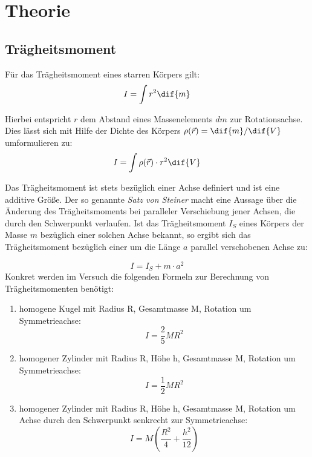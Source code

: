 \section{Theorie}

\subsection{Trägheitsmoment}
Für das Trägheitsmoment eines starren Körpers gilt:
\begin{equation}
   I = \int r^2 \dif{m}
\end{equation}

Hierbei entspricht $r$ dem Abstand eines Massenelements $dm$ zur Rotationsachse. Dies
lässt sich mit Hilfe der Dichte des Körpers $\rho(\vec{r}) = \dif{m}/\dif{V}$ umformulieren zu:
\begin{equation}
  I = \int \rho(\vec{r})\cdot r^2 \dif{V}
\end{equation}

Das Trägheitsmoment ist stets bezüglich einer Achse definiert und ist eine
additive Größe. Der so genannte \textit{Satz von Steiner} macht eine Aussage über die Änderung des Trägheitsmoments
bei paralleler Verschiebung jener Achsen, die durch den Schwerpunkt verlaufen. Ist das
Trägheitsmoment $I_S$ eines Körpers der Masse $m$ bezüglich einer solchen Achse bekannt, so ergibt sich das
Trägheitsmoment bezüglich einer um die Länge $a$ parallel verschobenen Achse zu:

\begin{equation}
    I = I_S + m \cdot a^2
    \label{eq: steiner}
\end{equation}
Konkret werden im Versuch die folgenden Formeln zur Berechnung von Trägheitsmomenten benötigt:
\begin{enumerate}
  \item homogene Kugel mit Radius R, Gesamtmasse M, Rotation um Symmetrieachse:
  \begin{equation}
    I = \frac{2}{5}M R^2
  \end{equation}

  \item homogener Zylinder mit Radius R, Höhe h, Gesamtmasse M, Rotation um Symmetrieachse:
  \begin{equation}
    I = \frac{1}{2} M R^2
  \end{equation}

  \item homogener Zylinder mit Radius R, Höhe h, Gesamtmasse M, Rotation um Achse durch den Schwerpunkt senkrecht zur Symmetrieachse:
  \begin{equation}
    I = M (\frac{R^2}{4} + \frac{h^2}{12})
  \end{equation}
\end{enumerate}

